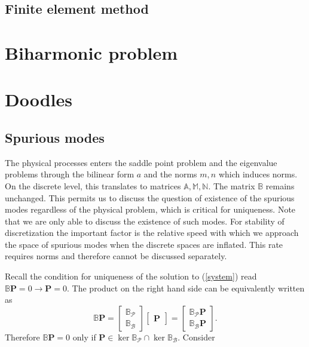 \documentclass[a4paper,10pt]{article}
\newcommand{\Bp}{\ensuremath{\mathbb{B}_{\mathcal{P}}}}
\newcommand{\Bb}{\ensuremath{\mathbb{B}_{\mathcal{B}}}}
\newcommand{\Amat}{\ensuremath{\mathbb{A}}}
\newcommand{\Bmat}{\ensuremath{\mathbb{B}}}
\newcommand{\Mmat}{\ensuremath{\mathbb{M}}}
\newcommand{\Nmat}{\ensuremath{\mathbb{N}}}
\newcommand{\Pvec}{\ensuremath{\mathbf{P}}}
\begin{document}
\subsection{Finite element method}
\section{Biharmonic problem}
\section{Doodles}
\subsection{Spurious modes}
The physical processes enters the saddle point problem and the eigenvalue
problems through the bilinear form $a$ and the norms $m, n$ which induces norms.
On the discrete level, this translates to matrices $\Amat, \Mmat, \Nmat$. The 
matrix $\Bmat$ remains unchanged. This permits us to discuss the question of
existence of the spurious modes regardless of the physical problem, which is
critical for uniqueness. Note that we are only able to discuss the existence of
such modes. For stability of discretization the important factor is the relative
speed with which we approach the space of spurious modes when the discrete spaces
are inflated. This rate requires norms and therefore cannot be discussed separately.

Recall the condition for uniqueness of the solution to (\ref{system}) read
$\Bmat\Pvec=0\rightarrow\Pvec=0$. The product on the right hand side can
be equivalently written as
\[
  \Bmat\Pvec = \begin{bmatrix}
                \Bp \\
                \Bb
               \end{bmatrix}
               \begin{bmatrix}
                 \Pvec
               \end{bmatrix}
               =\begin{bmatrix}
                \Bp\Pvec \\
                \Bb\Pvec
               \end{bmatrix}.
\]
Therefore $\Bmat\Pvec=0$ only if $\Pvec\in\ker{\Bp}\cap\ker{\Bb}$. Consider
  


  
  
\end{document}
